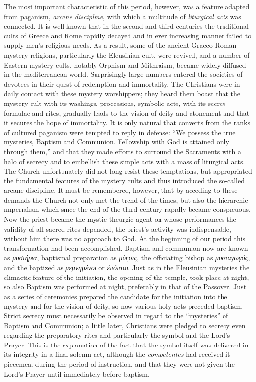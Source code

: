 The most important characteristic of this period, however, was a feature adapted from paganism, \emph{arcane discipline}, with which a multitude of \emph{liturgical acts} was connected. It is well known that in the second and third centuries the traditional cults of Greece and Rome rapidly decayed and in ever increasing manner failed to supply men’s religious needs. As a result, some of the ancient Graeco-Roman mystery religions, particularly the Eleusinian cult, were revived, and a number of Eastern mystery cults, notably Orphism and Mithraism, became widely diffused in the mediterranean world. Surprisingly large numbers entered the societies of devotees
in their quest of redemption and immortality. The Christians were in daily contact with these mystery worshippers; they heard them boast that the mystery cult with its washings, processions, symbolic acts, with its secret formulae and rites, gradually leads to the vision of deity and atonement and that it secures the hope of immortality. It is only natural that converts from the ranks of cultured paganism were tempted to reply in defense: “We possess the true mysteries, Baptism and Communion. Fellowship with God is attained only through them,” and that they made efforts to surround the Sacraments with a halo of secrecy and to embellish these simple acts with a mass of liturgical acts. The Church unfortunately did not long resist these temptations, but appropriated the fundamental features of the mystery cults and thus introduced the so-called arcane discipline. It must be remembered, however, that by acceding to these demands the Church not only met the trend of the times, but also the hierarchic imperialism which since the end of the third century rapidly became conspicuous. Now the priest became the mystic-theurgic agent on whose performances the validity of all sacred rites depended, the priest’s activity was indispensable, without him there was no approach to God. At the beginning of our period this transformation had been accomplished. Baptism and communion now are known as \emph{μυστήρια}, baptismal preparation as \emph{μύησις}, the officiating bishop as \emph{μυσταγωγός}, and the baptized as \emph{μεμνημένοι} or \emph{ἐπόπται}. Just as in the Eleusinian mysteries the climactic feature of the initiation, the opening of the temple, took place at night, so also Baptism was performed at night, preferably in that of the Passover. Just as a series of ceremonies prepared the candidate for the initiation into the mystery and for the vision of deity, so now various holy acts preceded baptism. Strict secrecy must necessarily be observed in regard to the “mysteries” of Baptism and Communion; a little later, Christians
were pledged to secrecy even regarding the preparatory rites and particularly the symbol and the Lord’s Prayer. This is the explanation of the fact that the symbol itself was delivered in its integrity in a final solemn act, although the \emph{competentes} had received it piecemeal during the period of instruction, and that they were not given the Lord’s Prayer until immediately before baptism.

